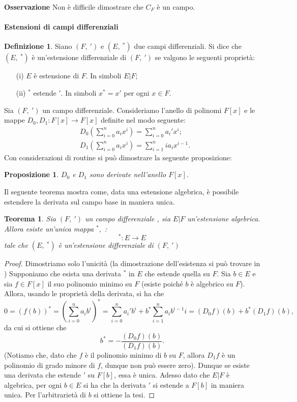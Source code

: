 \documentclass[10pt,oneside]{article}
\theoremstyle{definition}
\theoremstyle{plain}
\newtheorem{teo}{Teorema}
\theoremstyle{definition}
\newtheorem{dfn}{Definizione}
\theoremstyle{plain}
\newtheorem{prop}{Proposizione}
\theoremstyle{plain}
\begin{document}
\textbf{Osservazione} Non è difficile dimostrare che $C_F$ è un campo.
\paragraph{Estensioni di campi differenziali}

\begin{dfn}
Siano $(F,\ ')$ e $(E,\ ^*)$ due campi differenziali. Si dice che $(E,\ ^*)$ è un'estensione differenziale di $(F,\ ')$ se valgono le seguenti proprietà:
\begin{enumerate}
\item[(i)] $E$ è estensione di $F$. In simboli $E|F$;
\item[(ii)] $^*$ estende $'$. In simboli $x^*=x'$ per ogni $x \in F$.
\end{enumerate}
\end{dfn}


Sia $(F, \ ')$ un campo differenziale. Consideriamo l'anello di polinomi $F[x]$ e le mappe $D_0,D_1: F[x] \to F[x]$ definite nel modo seguente:
\[\begin{split} 
&D_0 \left(\sum_{i=0}^n a_ix^i \right)= \sum_{i=0}^n a_i'x^i;\\ 
&D_1\left( \sum_{i=0}^n a_ix^i \right)= \sum_{i=1}^n i a_i x^{i-1}. 
\end{split}\]
Con considerazioni di routine si può dimostrare la seguente proposizione:
\begin{prop}
$D_0$ e $D_1$ sono derivate nell'anello $F[x]$.
\end{prop}
Il seguente teorema mostra come, data una estensione algebrica, è possibile estendere la derivata sul campo base in maniera unica.
\begin{teo}\label{teo:estder}
Sia $(F,\  ')$ un campo differenziale , sia $E|F$ un'estensione algebrica. Allora esiste un'unica mappa $^*,$ :
\[^*:E \longrightarrow E \]
tale che $(E,\ ^*)$ è un'estensione differenziale di $(F, \ ')$
\end{teo}
\begin{proof}
Dimostriamo solo l'unicità (la dimostrazione dell'esistenza si può trovare in \cite{Bro})
Supponiamo che esista una derivata $^*$ in $E$ che estende quella su $F$.
Sia $b \in E$ e sia $f \in F[x]$ il suo polinomio minimo su $F$ (esiste poiché $b$ è algebrico su $F$). Allora, usando le proprietà della derivata, si ha che 
\[0=(f(b))^*=\left(\sum_{i=0}^n a_ib^i \right)^*=\sum_{i=0}^na_i'b^i+b^*\sum_{i=1}^na_ib^{i-1}i= (D_0f)(b)+b^*(D_1f)(b), \]
da cui si ottiene che 
\[b^* = -\frac{(D_0f)(b)}{(D_1f)(b)}. \]
(Notiamo che, dato che $f$ è il polinomio minimo di $b$ su $F$, allora $D_1f$ è un polinomio di grado minore di $f$, dunque non può essere zero). Dunque se esiste una derivata che estende $'$ su $F[b]$, essa è unica. Adesso dato che $E|F$ è algebrica, per ogni $b \in E$ si ha che la derivata $'$ si estende a $F[b]$ in maniera unica. Per l'arbitrarietà di $b$ si ottiene la tesi. 
\end{proof}
\end{document}
